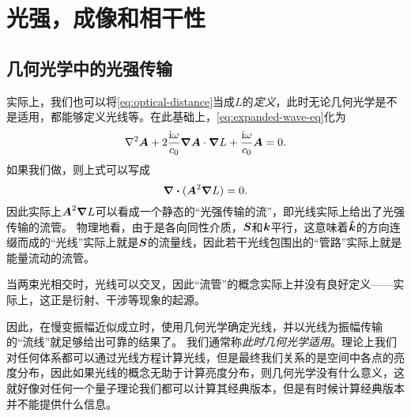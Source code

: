 \section{光强，成像和相干性}

\subsection{几何光学中的光强传输}

实际上，我们也可以将\eqref{eq:optical-distance}当成$L$的\emph{定义}，此时无论几何光学是不是适用，都能够定义光线等。在此基础上，\eqref{eq:expanded-wave-eq}化为
\begin{equation}
    \laplacian \vb*{A} + 2 \frac{\ii \omega}{c_0} \grad{\vb*{A}} \cdot \grad{L} + \frac{\ii \omega}{c_0} \vb*{A} = 0.
\end{equation}
如果我们做，则上式可以写成
\begin{equation}
    \div{(\vb*{A}^2 \grad{L})} = 0.
\end{equation}
因此实际上$\vb*{A}^2 \grad{L}$可以看成一个静态的“光强传输的流”，即光线实际上给出了光强传输的流管。
物理地看，由于是各向同性介质，$\vb*{S}$和$\vb*{k}$平行，这意味着$\vu*{k}$的方向连缀而成的“光线”实际上就是$\vb*{S}$的流量线，因此若干光线包围出的“管路”实际上就是能量流动的流管。

当两束光相交时，光线可以交叉，因此“流管”的概念实际上并没有良好定义——实际上，这正是衍射、干涉等现象的起源。%

因此，在慢变振幅近似成立时，使用几何光学确定光线，并以光线为振幅传输的“流线”就足够给出可靠的结果了。
我们通常称\emph{此时几何光学适用}。理论上我们对任何体系都可以通过光线方程计算光线，但是最终我们关系的是空间中各点的亮度分布，因此如果光线的概念无助于计算亮度分布，则几何光学没有什么意义，这就好像对任何一个量子理论我们都可以计算其经典版本，但是有时候计算经典版本并不能提供什么信息。

